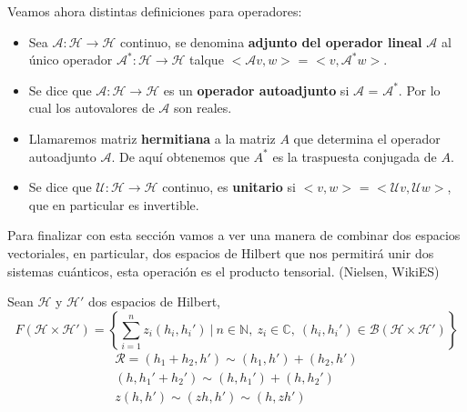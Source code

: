 \newpage

Veamos ahora distintas definiciones para operadores:
\begin{itemize}
    \item Sea $\mathscr{A}:\mathscr{H} \rightarrow \mathscr{H}$ continuo, se denomina \textbf{adjunto del operador lineal} $\mathscr{A}$ al único operador   $\mathscr{A}^{*}:\mathscr{H} \rightarrow \mathscr{H}$ talque $<\mathscr{A}v,w>$ = $<v,\mathscr{A}^{*}w>$.
    \item Se dice que $\mathscr{A}:\mathscr{H} \rightarrow \mathscr{H}$ es un \textbf{operador autoadjunto} si $\mathscr{A}$ = $\mathscr{A}^{*}$. Por lo cual los autovalores de $\mathscr{A}$ son reales.
    \item Llamaremos matriz \textbf{hermitiana} a la matriz $A$ que determina el operador autoadjunto $\mathscr{A}$. De aquí obtenemos que $A^{*}$ es la traspuesta conjugada de $A$.
    \item Se dice que $\mathscr{U}:\mathscr{H} \rightarrow \mathscr{H}$  continuo, es \textbf{unitario} si $<v,w>$ = $<\mathscr{U}v,\mathscr{U}w>$, que en particular es invertible.
\end{itemize}

\vspace{5pt}

Para finalizar con esta sección vamos a ver una manera de combinar dos espacios vectoriales, en particular, dos espacios de Hilbert que nos permitirá unir dos sistemas cuánticos, esta operación es el producto tensorial. (Nielsen, WikiES)

\vspace{5pt}

Sean $\mathscr{H}$ y $\mathscr{H}'$ dos espacios de Hilbert,
\begin{equation*}
    F(\mathscr{H} \times \mathscr{H}') = \left\lbrace \sum_{i=1}^{n}z_{i} (h_{i},h_{i}')\:|\:n \in \mathbb{N},\: z_{i} \in \mathbb{C},\:(h_{i},h_{i}') \in \mathscr{B}(\mathscr{H} \times \mathscr{H}') \right\rbrace
\end{equation*}
\begin{equation*}
\begin{split}
    \mathscr{R} =  (h_{1}+h_{2},h') \sim (h_{1},h') + (h_{2},h') \\ 
    (h,h_{1}'+h_{2}') \sim (h,h_{1}') + (h,h_{2}') \\
    z(h,h') \sim (z h,h') \sim (h,z h')
\end{split}
\end{equation*}


